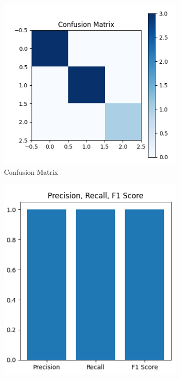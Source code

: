 \documentclass{article}
\begin{document}
\begin{figure}[h]
    \centering
    \begin{subfigure}[b]{0.3\textwidth}
        \includegraphics[width=\textwidth]{conf_matrix.png}
        \caption{Confusion Matrix}
        \label{fig:figure1}
    \end{subfigure}
    \hspace{1cm} %
    \begin{subfigure}[b]{0.3\textwidth}
        \includegraphics[width=\textwidth]{prf1_bar_chart.png}

\end{subfigure}
\end{figure}
\end{document}
